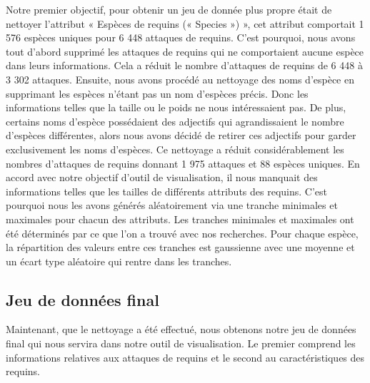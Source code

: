 \documentclass{article}
\begin{document}
Notre premier objectif, pour obtenir un jeu de donnée plus propre était de nettoyer l’attribut « Espèces de requins (« Species ») », cet attribut comportait 1 576 espèces uniques pour 6 448 attaques de requins.
C’est pourquoi, nous avons tout d’abord supprimé les attaques de requins qui ne comportaient aucune espèce dans leurs informations. Cela a réduit le nombre d’attaques de requins de 6 448 à 3 302 attaques.
Ensuite, nous avons procédé au nettoyage des noms d’espèce en supprimant les espèces n’étant pas un nom d’espèces précis. Donc les informations telles que la taille ou le poids ne nous intéressaient pas.
De plus, certains noms d’espèce possédaient des adjectifs qui agrandissaient le nombre d’espèces différentes, alors nous avons décidé de retirer ces adjectifs pour garder exclusivement les noms d’espèces.
Ce nettoyage a réduit considérablement les nombres d’attaques de requins donnant 1 975 attaques et 88 espèces uniques.
En accord avec notre objectif d’outil de visualisation, il nous manquait des informations telles que les tailles de différents attributs des requins. C’est pourquoi nous les avons générés aléatoirement via une tranche minimales et maximales pour chacun des attributs. Les tranches minimales et maximales ont été déterminés par ce que l'on a trouvé avec nos recherches. Pour chaque espèce, la répartition des valeurs entre ces tranches est gaussienne avec une moyenne et un écart type aléatoire qui rentre dans les tranches.


\clearpage
\subsection{Jeu de données final}
Maintenant, que le nettoyage a été effectué, nous obtenons notre jeu de données final qui nous servira dans notre outil de visualisation. Le premier comprend les informations relatives aux attaques de requins et le second au caractéristiques des requins.
\end{document}
